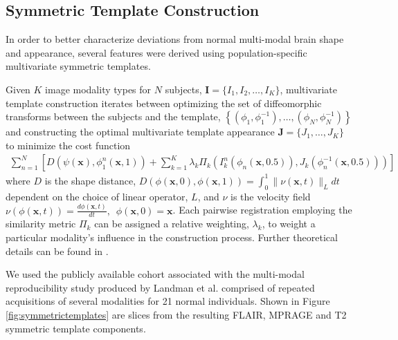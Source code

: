 \documentclass{llncs}
\begin{document}
\subsection{Symmetric Template Construction}

In order to better characterize deviations from normal
multi-modal brain shape and appearance, several features were derived 
using population-specific multivariate symmetric templates. 

Given $K$ image modality types for $N$ subjects,  
${\mathbf I} = \{I_1,I_2,\ldots, I_K\}$, multivariate 
template construction iterates between optimizing the set 
of diffeomorphic transforms between the subjects and the 
template, 
$\left\{\left(\phi_1,\phi_1^{-1}\right),\ldots,\left(\phi_N,\phi_N^{-1}\right)\right\}$ 
and constructing the 
optimal multivariate template appearance 
$\mathbf{J}=\{J_1,\ldots, J_K\}$ to minimize the
cost function
\begin{align}
  \sum_{n=1}^N 
        \left[ D \left( \psi(\mathbf{x}),\phi_1^n(\mathbf{x},1)\right)
        + \sum_{k=1}^K \lambda_k \Pi_k \left(I_k^n\left(\phi_n(\mathbf{x},0.5)\right),J_k\left(\phi^{-1}_n(\mathbf{x},0.5)\right)\right)\right]
\end{align}
where $D$ is the shape distance,
$D\left( \phi( \mathbf{x},0),\phi( \mathbf{x},1)\right) = \int_0^1 \| \nu(\mathbf{x},t)\|_L dt$
dependent on the choice of linear operator, $L$, and $\nu$
is the velocity field
$\nu\left( \phi(\mathbf{x},t) \right) = \frac{d\phi(\mathbf{x},t)}{dt},\,\,\, \phi(\mathbf{x},0) = \mathbf{x}$.
Each pairwise registration employing the similarity metric $\Pi_k$ can 
be assigned a relative weighting, $\lambda_k$, to weight a particular
modality's influence in the construction process.  Further theoretical
details can be found in \cite{avants2008,avants2010}.

We used the publicly available cohort associated with the multi-modal
reproducibility study produced by Landman et al. \cite{landman2011}
comprised of repeated acquisitions of several modalities for 21 normal 
individuals.  Shown in Figure \ref{fig:symmetrictemplates} are slices
from the resulting FLAIR, MPRAGE and T2 symmetric template components.
\end{document}
